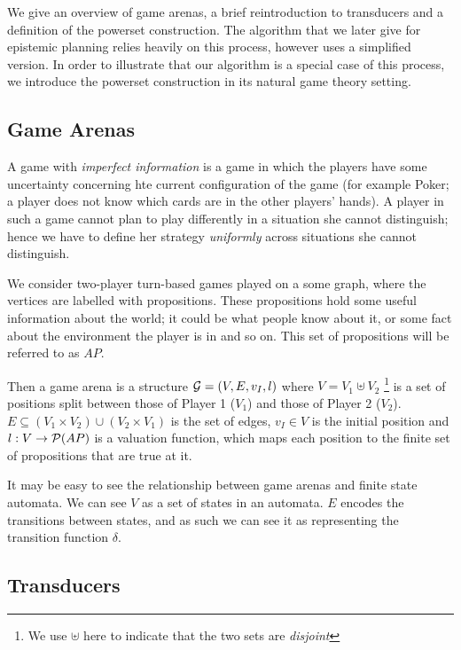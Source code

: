 \documentclass[10pt, a4paper]{report}
\begin{document}
We give an overview of game arenas, a brief reintroduction to transducers and
a definition of the powerset construction. The algorithm that we later give for
epistemic planning relies heavily on this process, however uses a simplified
version. In order to illustrate that our algorithm is a special case of this
process, we introduce the powerset construction in its natural game theory
setting. 

\subsection{Game Arenas}

A game with \emph{imperfect information} is a game in which the players have
some uncertainty concerning hte current configuration of the game (for example
Poker; a player does not know which cards are in the other players' hands). A
player in such a game cannot plan to play differently in a situation she cannot
distinguish; hence we have to define her strategy \emph{uniformly} across
situations she cannot distinguish. 

We consider two-player turn-based games played on a some graph, where the
vertices are labelled with propositions. These propositions hold some useful
information about the world; it could be what people know about it, or some fact
about the environment the player is in and so on. This set of propositions will
be referred to as $AP$. 

Then a game arena is a structure $\mathcal{G} = (V, E, v_I, l)$ where $V = V_1 \uplus
V_2$ \footnote{We use $\uplus$ here to indicate that the two sets are
  \emph{disjoint}} is a set of positions split between those of Player 1 ($V_1$)
and those of Player 2 ($V_2$). $E \subseteq (V_1 \times V_2) \cup (V_2 \times
V_1)$ is the set of edges, $v_I \in V$ is the initial position and $l : V
\rightarrow \mathcal{P}(AP)$ is a valuation function, which maps each position to the
finite set of propositions that are true at it.

It may be easy to see the relationship between game arenas and finite state
automata. We can see $V$ as a set of states in an automata. $E$ encodes the
transitions between states, and as such we can see it as representing the
transition function $\delta$.

\subsection{Transducers}
\label{subsec:Transducers}
\end{document}
